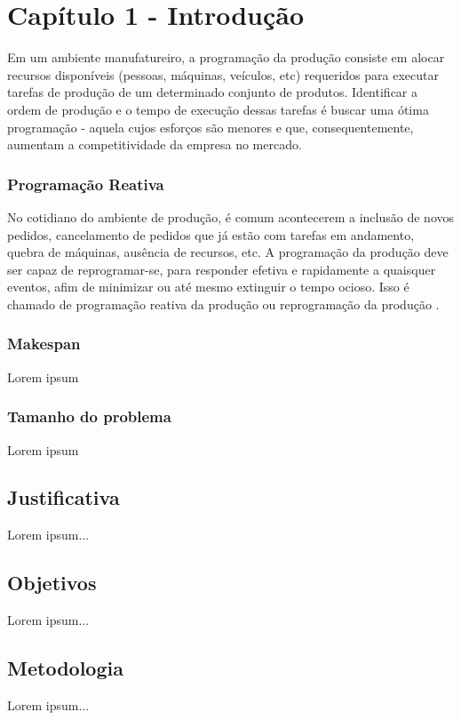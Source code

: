 
\newpage
\section{Capítulo 1 - Introdução}
Em um ambiente manufatureiro, a programação da produção consiste em alocar recursos disponíveis (pessoas, máquinas, veículos, etc) requeridos para executar tarefas de produção de um determinado conjunto de produtos. Identificar a ordem de produção e o tempo de execução dessas tarefas é buscar uma ótima programação - aquela cujos esforços são menores e que, consequentemente, aumentam a competitividade da empresa no mercado.

\subsubsection{Programação Reativa}
No cotidiano do ambiente de produção, é comum acontecerem a inclusão de novos pedidos, cancelamento de pedidos que já estão com tarefas em andamento, quebra de máquinas, ausência de recursos, etc. A programação da produção deve ser capaz de reprogramar-se, para responder efetiva e rapidamente a quaisquer eventos, afim de minimizar ou até mesmo extinguir o tempo ocioso. Isso é chamado de programação reativa da produção ou reprogramação da produção \cite{SUN}.

    \subsubsection{Makespan}
    Lorem ipsum
        
    \subsubsection{Tamanho do problema}
    Lorem ipsum

\subsection{Justificativa}
Lorem ipsum...

\subsection{Objetivos}
Lorem ipsum...

\subsection{Metodologia}
Lorem ipsum...